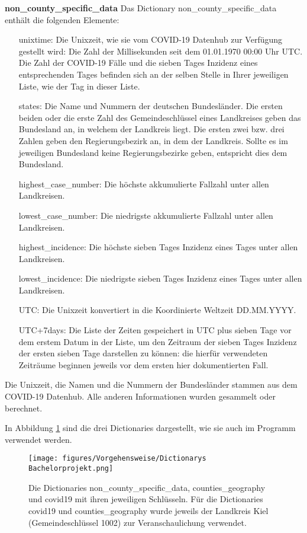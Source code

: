 \textbf{non\_county\_specific\_data}
Das Dictionary non\_county\_specific\_data enthält die folgenden Elemente:
\begin{itemize}
    \item[unixtime:] Die Unixzeit, wie sie vom COVID-19 Datenhub zur Verfügung gestellt wird: Die Zahl der Millisekunden seit dem 01.01.1970 00:00 Uhr UTC. Die Zahl der COVID-19 Fälle und die sieben Tages Inzidenz eines entsprechenden Tages befinden sich an der selben Stelle in Ihrer jeweiligen Liste, wie der Tag in dieser Liste.
    \item[states:] Die Name und Nummern der deutschen Bundesländer. Die ersten beiden oder die erste Zahl des Gemeindeschlüssel eines Landkreises geben das Bundesland an, in welchem der Landkreis liegt. Die ersten zwei bzw. drei Zahlen geben den Regierungsbezirk an, in dem der Landkreis. Sollte es im jeweiligen Bundesland keine Regierungsbezirke geben, entspricht dies dem Bundesland.
    \item[highest\_case\_number:] Die höchste akkumulierte Fallzahl unter allen Landkreisen.
    \item[lowest\_case\_number:] Die niedrigste akkumulierte Fallzahl unter allen Landkreisen.
    \item[highest\_incidence:] Die höchste sieben Tages Inzidenz eines Tages unter allen Landkreisen.
    \item[lowest\_incidence:] Die niedrigste sieben Tages Inzidenz eines Tages unter allen Landkreisen.
    \item[UTC:] Die Unixzeit konvertiert in die Koordinierte Weltzeit \glqq{}DD.MM.YYYY\grqq{}.
    \item[UTC+7days:] Die Liste der Zeiten gespeichert in UTC plus sieben Tage vor dem erstem Datum in der Liste, um den Zeitraum der sieben Tages Inzidenz der ersten sieben Tage darstellen zu können: die hierfür verwendeten Zeiträume beginnen jeweils vor dem ersten hier dokumentierten Fall.
\end{itemize}
Die Unixzeit, die Namen und die Nummern der Bundesländer stammen aus dem \glqq{}COVID-19 Datenhub\grqq{}. Alle anderen Informationen wurden gesammelt oder berechnet.

In Abbildung \ref{fig:dicts_als_code} sind die drei Dictionaries dargestellt, wie sie auch im Programm verwendet werden.
\begin{figure}[H]
    \centering
    \texttt{[image: figures/Vorgehensweise/Dictionarys Bachelorprojekt.png]}
    \caption{
    Die Dictionaries non\_county\_specific\_data, counties\_geography und covid19 mit ihren jeweiligen Schlüsseln.
    Für die Dictionaries covid19 und counties\_geography wurde jeweils der Landkreis Kiel (Gemeindeschlüssel 1002) zur Veranschaulichung verwendet.}
    \label{fig:dicts_als_code}
\end{figure}

